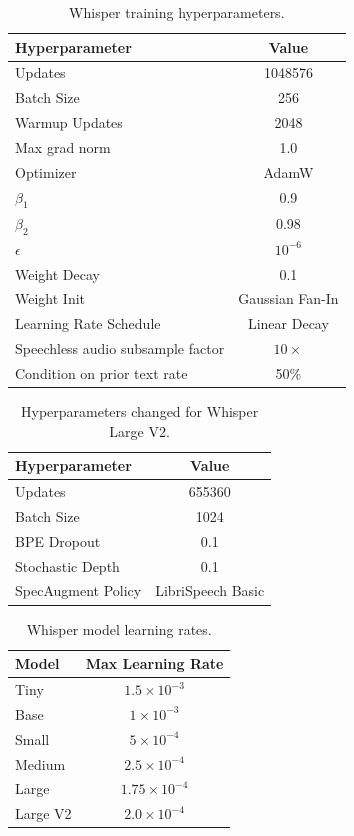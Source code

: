 \documentclass[nohyperref]{article}
\theoremstyle{plain}
\theoremstyle{definition}
\theoremstyle{remark}
\begin{document}
\begin{table}[H]
\centering
\begin{tabular}{l|c} \toprule
    Hyperparameter & Value \\
    \midrule
    Updates & 1048576 \\
    Batch Size & 256 \\
    Warmup Updates & 2048 \\
    Max grad norm & 1.0 \\
    Optimizer & AdamW \\
    $\beta_{1}$ & 0.9 \\
    $\beta_{2}$ & 0.98 \\
    $\epsilon$ & $10^{-6}$ \\
    Weight Decay & 0.1 \\
    Weight Init & Gaussian Fan-In \\
    Learning Rate Schedule & Linear Decay \\
    Speechless audio subsample factor & $10\times$ \\
    Condition on prior text rate & 50\% \\
    \bottomrule
\end{tabular}
\caption{Whisper training hyperparameters.}\label{tab:hyperparams-training}
\end{table}

\begin{table}[H]
\centering
\begin{tabular}{l|c} \toprule
    Hyperparameter & Value \\
    \midrule
    Updates & 655360 \\
    Batch Size & 1024 \\
    BPE Dropout & 0.1 \\
    Stochastic Depth & 0.1 \\
    SpecAugment Policy & LibriSpeech Basic \\
    \bottomrule
\end{tabular}
\caption{Hyperparameters changed for Whisper Large V2.}\label{tab:hyperparams-training2}
\end{table}

\begin{table}[H]
\centering
\begin{tabular}{l|c} \toprule
    Model & Max Learning Rate \\
    \midrule
    Tiny & $1.5\times10^{-3}$\\
    Base & $1\times10^{-3}$\\
    Small & $5\times10^{-4}$\\
    Medium & $2.5\times10^{-4}$ \\
    Large & $1.75\times10^{-4}$ \\
    Large V2 & $2.0\times10^{-4}$ \\
    \bottomrule
\end{tabular}
\caption{Whisper model learning rates.}\label{tab:hyperparams-learning-rates}
\end{table}
\end{document}
